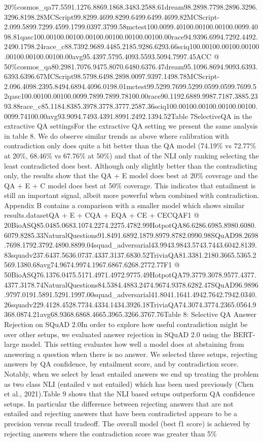 \documentclass{scrbook}
\begin{document}
20\%cosmos\_qa77.5591.1276.8869.1868.3483.2588.61dream98.2898.7798.2896.3296.3296.8198.28MCScript99.8299.4699.8299.6499.6499.4699.82MCScript-2.099.5899.7299.4599.1799.0397.3799.58mctest100.0099.40100.00100.00100.0099.4098.81qasc100.00100.00100.00100.00100.00100.00100.00race94.9396.6994.7292.4492.2490.1798.24race\_c88.7392.9689.4485.2185.9286.6293.66sciq100.00100.00100.00100.00100.00100.00100.00avg95.4397.5795.4093.5593.5094.7997.45ACC @ 50\%cosmos\_qa80.2981.7076.9475.8070.6480.6376.47dream95.1096.8694.9093.6393.6393.6396.67MCScript98.5798.6498.2898.0097.9397.1498.78MCScript-2.096.4098.2395.8494.6894.4096.0198.01mctest99.5299.7699.5299.0599.0599.7699.52qasc100.00100.00100.0099.7899.7899.78100.00race90.1192.6889.9987.7187.3885.2393.88race\_c85.1184.8385.3978.3778.3777.2587.36sciq100.00100.00100.00100.00100.0099.74100.00avg93.9094.7493.4391.8991.2492.1394.52Table 7SelectiveQA in the extractive QA settingsFor the extractive QA setting we present the same analysis in table 8. We do observe similar trends as above where calibration with contradiction only does quite a bit better than the QA model (74.19\% vs 72.77\% at 20\%, 68.46\% vs 67.76\% at 50\%) and that of the NLI only ranking selecting the least contradicted does best. Although only slightly better than the contradicting only, the results show that the QA + E model does best at 20\% coverage and the QA + E + C model does best at 50\% coverage. This indicates that entailment is still an important signal, albeit more powerful when combined with contradiction. Appendix B contains a comparison with a smaller model which shows similar results.datasetQA + E + CQA + EQA + CE + CECQAF1 @ 20BioASQ85.0485.0683.1074.2274.2275.4782.99HotpotQA86.6286.6985.8980.6080.6079.8285.33NaturalQuestions91.8491.6892.1879.8979.8782.0990.98SQuAD98.2698.7698.1792.3792.4890.8899.04squad\_adversarial43.9943.9843.5743.7443.6042.8139.83squadv237.6437.5636.0737.4337.3137.6830.52TriviaQA81.3381.2180.3665.5365.2569.1380.68avg74.9674.9974.1967.6867.6268.2772.77F1 @ 50BioASQ76.1376.0475.5171.4971.4972.9775.49HotpotQA79.3779.3078.9577.4377.4377.3178.74NaturalQuestions84.5384.4883.2474.9674.9378.6282.47SQuAD96.9896.9797.0191.5891.5291.1997.00squad\_adversarial41.8041.1641.4942.7642.7942.0340.26squadv229.4128.4528.7734.4334.1434.3926.18TriviaQA74.3074.3774.2365.0564.9368.0874.21avg68.9368.6868.4665.3965.3266.3767.76Table 8: Selective QA Answer Rejection on SQuAD 2.0In order to explore how useful contradiction might be over other setups, we evaluated answer rejection in SQuAD 2.0 using the BERT-large model. This setting evaluates how well a model does at abstaining from answering a question when there is no answer. We selected three setups, rejecting answers by QA confidence, by entailment score, and by contradiction score. Notably, when we select by least entailed answers we end up treating the problem as two class NLI (entailed v not entailed) which has been used previously (Chen et al., 2021).Table 9 shows that the NLI based setups outperform QA confidence setups. In particular the difference between rejecting answers that are not entailed and rejecting answers that have been contradicted appears to be a precision versus recall tradeoff. The overall model (best f1 score) is achieved by rejecting answers where the contradiction score was greater than 5\% 
\end{document}
